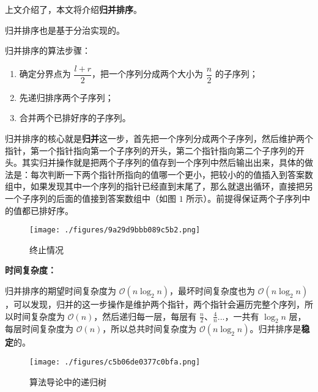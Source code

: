 
上文介绍了，本文将介绍\textbf{归并排序}。

归并排序也是基于分治实现的。

归并排序的算法步骤：
\begin{enumerate}
\item 确定分界点为 $\dfrac{l + r}{2}$，把一个序列分成两个大小为 $\dfrac{n}{2}$ 的子序列；
\item 先递归排序两个子序列；
\item 合并两个已排好序的子序列。
\end{enumerate}

归并排序的核心就是\textbf{归并}这一步，首先把一个序列分成两个子序列，然后维护两个指针，第一个指针指向第一个子序列的开头，第二个指针指向第二个子序列的开头。其实归并操作就是把两个子序列的值存到一个序列中然后输出出来，具体的做法是：每次判断一下两个指针所指向的值哪一个更小，把较小的的值插入到答案数组中，如果发现其中一个序列的指针已经直到末尾了，那么就退出循环，直接把另一个子序列的后面的值接到答案数组中（如图 $1$ 所示）。前提得保证两个子序列中的值都已排好序。

\begin{figure}[ht]
\centering
\texttt{[image: ./figures/9a29d9bbb089c5b2.png]}
\caption{终止情况} \label{fig_Msort_3}
\end{figure}

\textbf{时间复杂度：}

归并排序的期望时间复杂度为 $\mathcal{O}(n \log_2 n)$，最坏时间复杂度也为 $\mathcal{O}(n \log_2 n)$，可以发现，归并的这一步操作是维护两个指针，两个指针会遍历完整个序列，所以时间复杂度为 $\mathcal{O}(n)$，然后递归每一层，每层有 $\frac{n}{2}$、$\frac{4}{n}$...，一共有 $\log_2 n$ 层，每层时间复杂度为 $\mathcal{O}(n)$，所以总共时间复杂度为 $\mathcal{O}(n \log_2 n)$。归并排序是\textbf{稳定}的。

\begin{figure}[ht]
\centering
\texttt{[image: ./figures/c5b06de0377c0bfa.png]}
\caption{算法导论中的递归树} \label{fig_Msort_1}
\end{figure}

